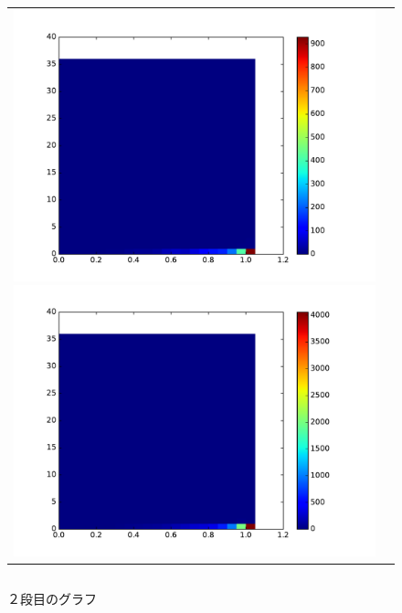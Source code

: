 \documentclass[a4paper,10pt,onecolumn,oneside,openany]{jsbook}
\begin{document}
\begin{figure}[h]
 \begin{tabular}{cc}
 	\begin{minipage}[t]{0.45\hsize}
	 \centering
	 \includegraphics[keepaspectratio, scale = 0.35]{colormap_block_1.pdf}
	 \caption{１段目のグラフ}
	 \label{first_block_color}
	\end{minipage}
        \begin{minipage}[t]{0.45\hsize}
	 \centering
	 \includegraphics[keepaspectratio, scale = 0.35]{colormap_block_2.pdf}
	 \caption{２段目のグラフ}
	 \label{second_block_color}
	\end{minipage}
 \end{tabular}
  \begin{tabular}{cc}

\end{tabular}
\end{figure}
\end{document}

